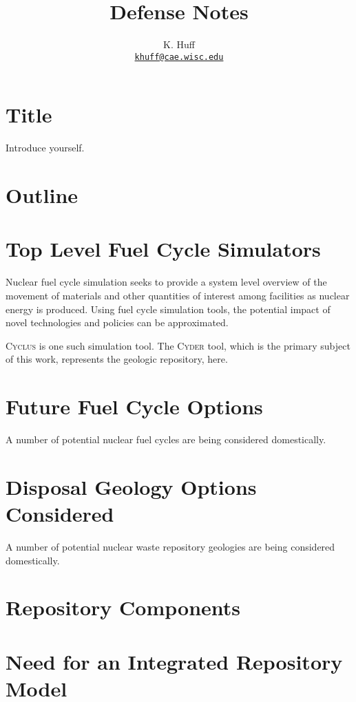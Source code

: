 \documentclass[letterpaper]{article}
\author{K. Huff
\\ \href{mailto:khuff@cae.wisc.edu}{\texttt{khuff@cae.wisc.edu}}
}
\date{}
\title{Defense Notes}
\newcommand{\Cyder}{\textsc{Cyder}\xspace}
\newcommand{\Cyclus}{\textsc{Cyclus}\xspace}
\begin{document}
\maketitle

\section*{Title}

Introduce yourself.

\section*{Outline}



\section*{Top Level Fuel Cycle Simulators}

Nuclear fuel cycle simulation seeks to provide a system level overview of the 
movement of materials and other quantities of interest among facilities as 
nuclear energy is produced. Using fuel cycle simulation tools, the potential 
impact of novel technologies and policies can be approximated. 

\Cyclus is one such simulation tool. The \Cyder tool, which is the primary 
subject of this work, represents the geologic repository, here.

\section*{Future Fuel Cycle Options}

A number of potential nuclear fuel cycles are being considered domestically. 

\section*{Disposal Geology Options Considered}

A number of potential nuclear waste repository geologies are being considered 
domestically. 

\section*{Repository Components}



\section*{Need for an Integrated Repository Model}
\end{document}
